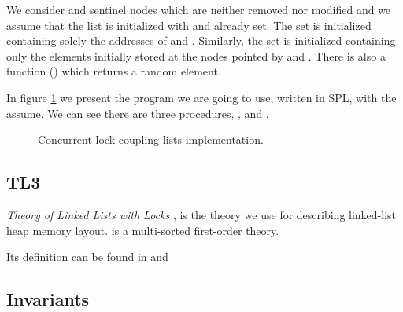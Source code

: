 We consider \head and \tail sentinel nodes which are neither removed nor 
modified and we assume that the list is initialized with \head and \tail 
already set.
%
The set \region is initialized containing solely the addresses of \head 
and \tail.
%
Similarly, the set \elements is initialized containing only the elements 
initially stored at the nodes pointed by \head and \tail.
%
There is also a function () which returns a random element. 

In figure \ref{fig:listcode} we present the program we are going to use, written in \gls{SPL}, with the assume. We can see there are three procedures, \Search, \Insert and \Remove. 

\begin{figure}[!htbp]
		\caption{ Concurrent lock-coupling lists implementation.}
		\label{fig:listcode}
\end{figure}

\subsection{TL3}

\emph{Theory of Linked Lists with Locks} \TLLpL, is the theory we use for describing linked-list heap memory layout. \TLLpL is a multi-sorted first-order theory.

Its definition can be found in  and \citep[6.2]{thesisAle}


\subsection{Invariants}


